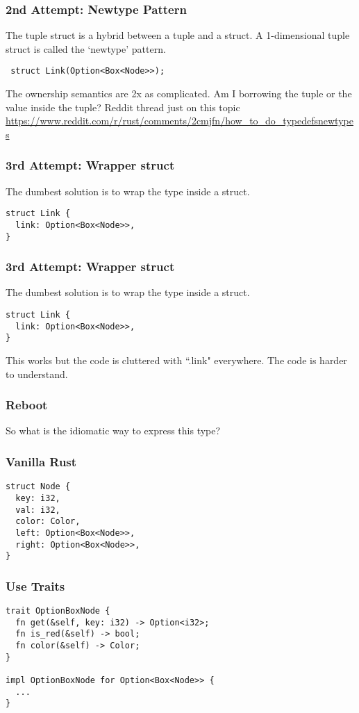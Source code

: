 \documentclass{beamer}
\begin{document}
\begin{frame}[t,fragile]
\frametitle{2nd Attempt: Newtype Pattern}
The tuple struct is a hybrid between a tuple and a struct. A 1-dimensional tuple struct is called the `newtype' pattern.
\begin{verbatim}
 struct Link(Option<Box<Node>>);
\end{verbatim}
The ownership semantics are 2x as complicated. Am I borrowing the tuple or the value inside the tuple? Reddit thread just on this topic {\color{blue} \url{https://www.reddit.com/r/rust/comments/2cmjfn/how_to_do_typedefsnewtypes}}
\end{frame}

\begin{frame}[t,fragile]
\frametitle{3rd Attempt: Wrapper struct}
The dumbest solution is to wrap the type inside a struct.
\begin{verbatim}
struct Link {
  link: Option<Box<Node>>,
}
\end{verbatim}
\end{frame}

\begin{frame}[t,fragile]
\frametitle{3rd Attempt: Wrapper struct}
The dumbest solution is to wrap the type inside a struct.
\begin{verbatim}
struct Link {
  link: Option<Box<Node>>,
}
\end{verbatim}
This works but the code is cluttered with ``.link" everywhere. The code is harder to understand.
\end{frame}

\begin{frame}
\frametitle{Reboot}
So what is the idiomatic way to express this type?
\end{frame}

\begin{frame}[fragile]
\frametitle{Vanilla Rust}
\begin{verbatim}
struct Node {
  key: i32,
  val: i32,
  color: Color,
  left: Option<Box<Node>>,
  right: Option<Box<Node>>,
}
\end{verbatim}
\end{frame}

\begin{frame}[fragile]
\frametitle{Use Traits}
\begin{verbatim}
trait OptionBoxNode {
  fn get(&self, key: i32) -> Option<i32>;
  fn is_red(&self) -> bool;
  fn color(&self) -> Color;
}

impl OptionBoxNode for Option<Box<Node>> {
  ...
}
\end{verbatim}
\end{frame}
\end{document}
